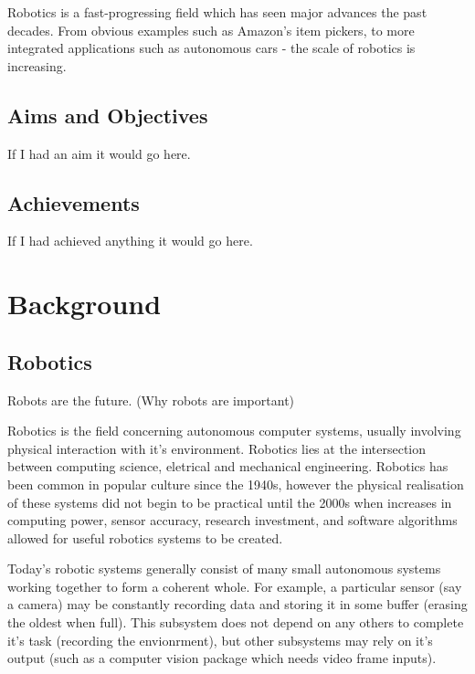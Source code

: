 \documentclass{l4proj}
\begin{document}
Robotics is a fast-progressing field which has seen major advances the past decades. From obvious examples such as Amazon's item pickers, to more integrated applications such as autonomous cars - the scale of robotics is increasing.

\section{Aims and Objectives}

If I had an aim it would go here.

\section{Achievements}

If I had achieved anything it would go here.




\chapter{Background}

\section{Robotics}

Robots are the future. (Why robots are important)

Robotics is the field concerning autonomous computer systems, usually involving physical interaction with it's environment. Robotics lies at the intersection between computing science, eletrical and mechanical engineering. Robotics has been common in popular culture since the 1940s, however the physical realisation of these systems did not begin to be practical until the 2000s when increases in computing power, sensor accuracy, research investment, and software algorithms allowed for useful robotics systems to be created.

Today's robotic systems generally consist of many small autonomous systems working together to form a coherent whole. For example, a particular sensor (say a camera) may be constantly recording data and storing it in some buffer (erasing the oldest when full). This subsystem does not depend on any others to complete it's task (recording the envionrment), but other subsystems may rely on it's output (such as a computer vision package which needs video frame inputs).
\end{document}
